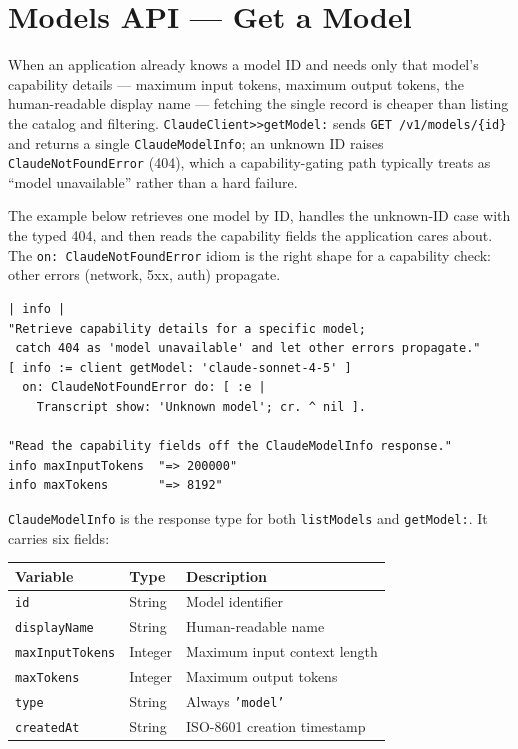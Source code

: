 \documentclass[a4paper,10pt,fleqn]{article}
\begin{document}
\section{Models API --- Get a Model}
\label{sec:models-get}

When an application already knows a model ID and needs only that
model's capability details --- maximum input tokens, maximum output
tokens, the human-readable display name --- fetching the single
record is cheaper than listing the catalog and filtering.
\texttt{ClaudeClient>>getModel:} sends \texttt{GET
/v1/models/\{id\}} and returns a single \texttt{ClaudeModelInfo};
an unknown ID raises \texttt{ClaudeNotFoundError} (404), which a
capability-gating path typically treats as ``model unavailable''
rather than a hard failure.

The example below retrieves one model by ID, handles the
unknown-ID case with the typed 404, and then reads the
capability fields the application cares about.  The
\texttt{on: ClaudeNotFoundError} idiom is the right shape for a
capability check: other errors (network, 5xx, auth) propagate.

\begin{lstlisting}[language={},title={Get specific model info}]
| info |
"Retrieve capability details for a specific model;
 catch 404 as 'model unavailable' and let other errors propagate."
[ info := client getModel: 'claude-sonnet-4-5' ]
  on: ClaudeNotFoundError do: [ :e |
    Transcript show: 'Unknown model'; cr. ^ nil ].

"Read the capability fields off the ClaudeModelInfo response."
info maxInputTokens  "=> 200000"
info maxTokens       "=> 8192"
\end{lstlisting}

\texttt{ClaudeModelInfo} is the response type for both
\texttt{listModels} and \texttt{getModel:}.  It carries six fields:

\begin{center}
\begin{tabular}{@{}llp{5.5cm}@{}}
\toprule
\textbf{Variable} & \textbf{Type} & \textbf{Description} \\
\midrule
\texttt{id}              & String   & Model identifier \\
\texttt{displayName}     & String   & Human-readable name \\
\texttt{maxInputTokens}  & Integer  & Maximum input context length \\
\texttt{maxTokens}       & Integer  & Maximum output tokens \\
\texttt{type}            & String   & Always \texttt{'model'} \\
\texttt{createdAt}       & String   & ISO-8601 creation timestamp \\
\bottomrule
\end{tabular}
\end{center}
\end{document}
